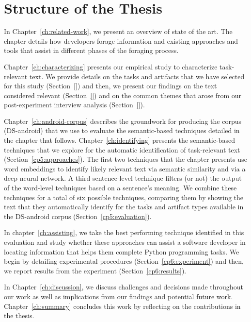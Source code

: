 \section{Structure of the Thesis}
\label{cp1:organization}

In Chapter~\ref{ch:related-work}, we present an overview of state of the art. The chapter details 
how developers forage information and existing approaches and tools 
that assist in different phases of the foraging process.


Chapter~\ref{ch:characterizing} presents our empirical study to characterize task-relevant text.
We provide details on the tasks and artifacts that we have selected for this study (Section~\ref{})
and then, we present our findings on the text considered relevant (Section~\ref{}) and 
on the common themes that arose from our post-experiment interview analysis (Section~\ref{}).


Chapter~\ref{ch:android-corpus} describes the groundwork 
for producing the corpus (\acs{DS-android}) that we use to evaluate the semantic-based techniques 
detailed in the chapter that follows.
Chapter~\ref{ch:identifying} presents the semantic-based techniques that we explore 
for the automatic identification of task-relevant text (Section~\ref{cp5:approaches}).
The first two techniques that the chapter presents 
use word embeddings to identify likely relevant text via semantic similarity
and via a deep neural network.
A third sentence-level technique filters (or not) 
the output of the word-level techniques based on a sentence's meaning.
We combine these techniques for a total of six possible techniques, comparing them by showing
the text that they automatically identify for the tasks and artifact types
available in the \acs{DS-android} corpus  (Section~\ref{cp5:evaluation}).




In chapter~\ref{ch:assisting}, we take the best performing technique identified in this evaluation and study 
whether these approaches can assist a software developer in locating information
that helps them complete Python programming tasks. We begin by detailing experimental procedures (Section~\ref{cp6:experiment})
and then, we report results from the experiment (Section~\ref{cp6:results}).


In Chapter~\ref{ch:discussion}, we discuss challenges and decisions 
made throughout our work 
as well as implications from our findings and potential future work. 
Chapter~\ref{ch:summary} concludes this work by reflecting on the contributions in the thesis. 
